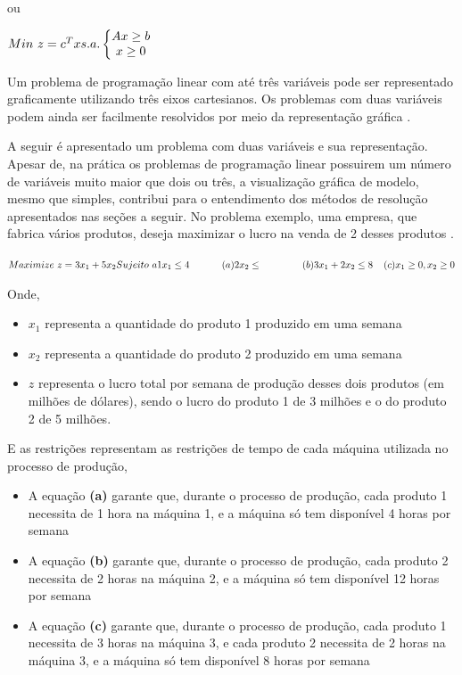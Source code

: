 ou  

$\\Min\ z = c^{T}x \\\\s.a.\left\{\begin{matrix}
Ax\geq  b\\x\geq 0 
\end{matrix}\right.$


Um problema de programação linear com até três variáveis pode ser representado graficamente utilizando três eixos cartesianos. Os problemas com duas variáveis podem ainda ser facilmente resolvidos por meio da representação gráfica \cite{Passos}. 

A seguir é apresentado um problema com duas variáveis e sua representação. Apesar de, na prática os problemas de programação linear possuirem um número de variáveis muito maior que dois ou três, a visualização gráfica de modelo, mesmo que simples, contribui para o entendimento dos métodos de resolução apresentados nas seções a seguir.
No problema exemplo, uma empresa, que fabrica vários produtos, deseja maximizar o lucro na venda de 2 desses produtos \cite{Hillier}.

$\\
Maximize\ z=3x_{1}+5x_{2}\\
Sujeito\ a \\
        1x_{1}\leq 4 \; \; \; \; \; \; \; \; \; \; \; \;(a)\\
        2x_{2}\leq \; \; \; \; \; \; \; \; \; \; \; \; \; \; \;(b)\\
        3x_{1}+2x_{2}\leq 8 \; \; \; \; (c)\\
        x_{1}\geq 0, x_{2}\geq 0 $

Onde, 
\begin{itemize}
\item \textbf {$x_{1}$} representa a quantidade do produto 1 produzido em uma semana
\item \textbf {$x_{2}$} representa a quantidade do produto 2 produzido em uma semana
\item \textbf {$z$} representa o lucro total por semana de produção desses dois produtos (em milhões de dólares), sendo o lucro do produto 1 de 3 milhões e o do produto 2 de 5 milhões.
\end{itemize}

E as restrições representam as restrições de tempo de cada máquina utilizada no processo de produção,
\begin{itemize}
\item A equação \textbf {(a)} garante que, durante o processo de produção, cada produto 1 necessita de 1 hora na máquina 1, e a máquina só tem disponível 4 horas por semana
\item A equação \textbf {(b)} garante que, durante o processo de produção, cada produto 2 necessita de 2 horas na máquina 2, e a máquina só tem disponível 12 horas por semana
\item A equação \textbf {(c)} garante que, durante o processo de produção, cada produto 1 necessita de 3 horas na máquina 3, e cada produto 2 necessita de 2 horas na máquina 3, e a máquina só tem disponível 8 horas por semana
\end{itemize}

